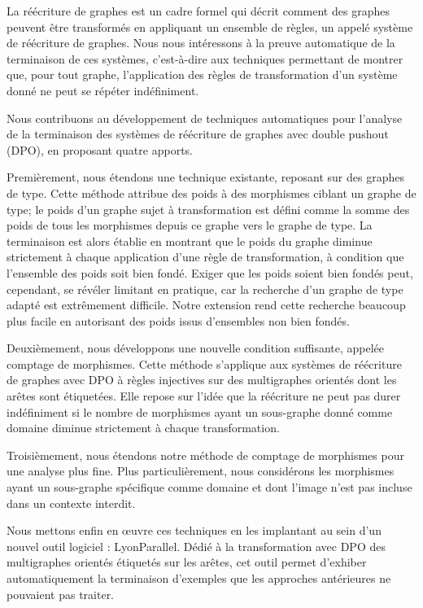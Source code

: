 La réécriture de graphes est un cadre formel qui décrit comment des graphes peuvent être transformés en appliquant un ensemble de règles, un appelé système de réécriture de graphes. Nous nous intéressons à la preuve automatique de la terminaison de ces systèmes, c'est-à-dire aux techniques permettant de montrer que, pour tout graphe, l'application des règles de transformation d'un système donné ne peut se répéter indéfiniment.

Nous contribuons au développement de techniques automatiques pour l'analyse de la terminaison des systèmes de réécriture de graphes avec double pushout (DPO), en proposant quatre apports.

Premièrement, nous étendons une technique existante,
reposant sur des graphes de type. Cette méthode attribue des poids à des morphismes ciblant un graphe de type; le poids d'un graphe sujet à transformation est défini comme la somme des poids de tous les morphismes depuis ce graphe vers le graphe de type. La terminaison est alors établie en montrant que le poids du graphe diminue strictement à chaque application d'une règle de transformation, à condition que l'ensemble des poids soit bien fondé. Exiger que les poids soient bien fondés peut, cependant, se révéler limitant en pratique, car 
la recherche d'un graphe de type adapté est extrêmement difficile. Notre extension rend cette recherche beaucoup plus facile en autorisant des poids issus d'ensembles non bien fondés.

Deuxièmement, nous développons une nouvelle condition suffisante, appelée comptage de morphismes. Cette méthode s'applique aux systèmes de réécriture de graphes avec DPO à règles injectives sur des multigraphes orientés dont les arêtes sont étiquetées. Elle repose sur l'idée que la réécriture ne peut pas durer indéfiniment si le nombre de morphismes ayant un sous-graphe donné comme domaine diminue strictement à chaque transformation.

Troisièmement, nous étendons notre méthode de comptage de morphismes pour une analyse plus fine. Plus particulièrement, nous considérons les morphismes ayant un sous-graphe spécifique comme domaine et dont l'image n'est pas incluse dans un contexte interdit.

Nous mettons enfin en œuvre ces techniques en les implantant au sein d'un nouvel outil logiciel : LyonParallel. Dédié à la transformation avec DPO des multigraphes orientés étiquetés sur les arêtes, cet outil permet d'exhiber automatiquement la terminaison d'exemples que les approches antérieures ne pouvaient pas traiter.
